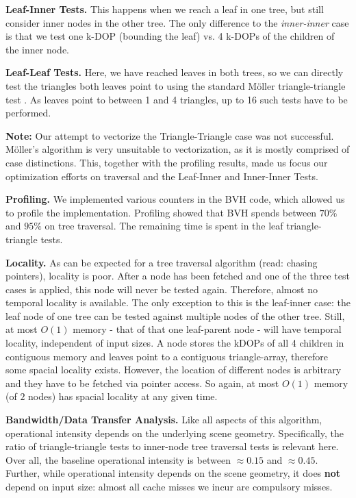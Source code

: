 \documentclass[twocolumn]{article}
\newcommand{\mypar}[1]{{\bf #1.}}
\begin{document}
\mypar{Leaf-Inner Tests}
This happens when we reach a leaf in one tree, but still consider inner nodes in the other tree. 
The only difference to the \textit{inner-inner} case is that we test one k-DOP (bounding the leaf) vs. 4 k-DOPs of the children of the inner node.

\mypar{Leaf-Leaf Tests}
Here, we have reached leaves in both trees, so we can directly test the triangles both leaves point to using the standard Möller triangle-triangle test \cite{moeller}.
As leaves point to between 1 and 4 triangles, up to 16 such tests have to be performed.

\textbf{Note: } Our attempt to vectorize the Triangle-Triangle case was not successful.
Möller's algorithm is very unsuitable to vectorization, as it is mostly comprised of case distinctions.
This, together with the profiling results, made us focus our optimization efforts on traversal and the Leaf-Inner and Inner-Inner Tests.

\mypar{Profiling}
We implemented various counters in the BVH code, which allowed us to profile the implementation.
Profiling showed that BVH spends between $70\%$ and $95\%$ on tree traversal. 
The remaining time is spent in the leaf triangle-triangle tests.

\mypar{Locality} 
As can be expected for a tree traversal algorithm (read: chasing pointers), locality is poor. 
After a node has been fetched and one of the three test cases is applied, this node will never be tested again. 
Therefore, almost no temporal locality is available.
The only exception to this is the leaf-inner case: the leaf node of one tree can be tested against multiple nodes of the other tree.
Still, at most $O(1)$ memory - that of that one leaf-parent node - will have temporal locality, independent of input sizes.
A node stores the kDOPs of all 4 children in contiguous memory and leaves point to a contiguous triangle-array, therefore some spacial locality exists. 
However, the location of different nodes is arbitrary and they have to be fetched via pointer access.
So again, at most $O(1)$ memory (of $2$ nodes) has spacial locality at any given time. 

\mypar{Bandwidth/Data Transfer Analysis}
Like all aspects of this algorithm, operational intensity depends on the underlying scene geometry. 
Specifically, the ratio of triangle-triangle tests to inner-node tree traversal tests is relevant here. 
Over all, the baseline operational intensity is between $\approx 0.15$ and $\approx 0.45$.
Further, while operational intensity depends on the scene geometry, it does \textbf{not} depend on input size: almost all cache misses we incur are compulsory misses.
\end{document}
